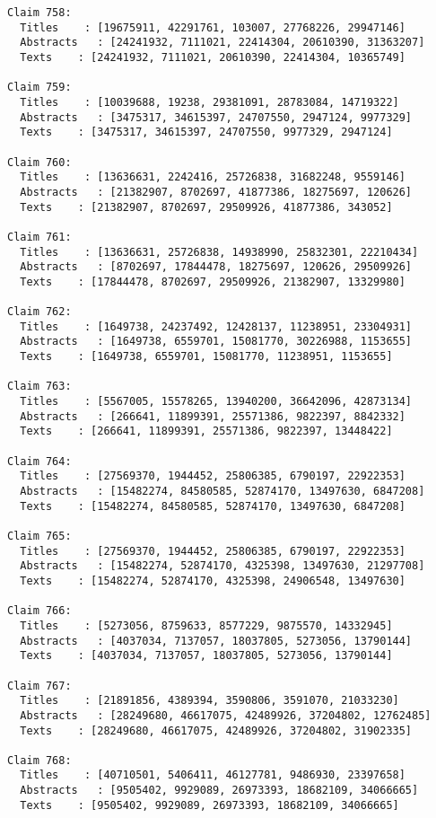 \documentclass[11pt]{article}
\begin{document}
\begin{Verbatim}[commandchars=\\\{\}]
Claim 758:
  Titles    : [19675911, 42291761, 103007, 27768226, 29947146]
  Abstracts   : [24241932, 7111021, 22414304, 20610390, 31363207]
  Texts    : [24241932, 7111021, 20610390, 22414304, 10365749]

Claim 759:
  Titles    : [10039688, 19238, 29381091, 28783084, 14719322]
  Abstracts   : [3475317, 34615397, 24707550, 2947124, 9977329]
  Texts    : [3475317, 34615397, 24707550, 9977329, 2947124]

Claim 760:
  Titles    : [13636631, 2242416, 25726838, 31682248, 9559146]
  Abstracts   : [21382907, 8702697, 41877386, 18275697, 120626]
  Texts    : [21382907, 8702697, 29509926, 41877386, 343052]

Claim 761:
  Titles    : [13636631, 25726838, 14938990, 25832301, 22210434]
  Abstracts   : [8702697, 17844478, 18275697, 120626, 29509926]
  Texts    : [17844478, 8702697, 29509926, 21382907, 13329980]

Claim 762:
  Titles    : [1649738, 24237492, 12428137, 11238951, 23304931]
  Abstracts   : [1649738, 6559701, 15081770, 30226988, 1153655]
  Texts    : [1649738, 6559701, 15081770, 11238951, 1153655]

Claim 763:
  Titles    : [5567005, 15578265, 13940200, 36642096, 42873134]
  Abstracts   : [266641, 11899391, 25571386, 9822397, 8842332]
  Texts    : [266641, 11899391, 25571386, 9822397, 13448422]

Claim 764:
  Titles    : [27569370, 1944452, 25806385, 6790197, 22922353]
  Abstracts   : [15482274, 84580585, 52874170, 13497630, 6847208]
  Texts    : [15482274, 84580585, 52874170, 13497630, 6847208]

Claim 765:
  Titles    : [27569370, 1944452, 25806385, 6790197, 22922353]
  Abstracts   : [15482274, 52874170, 4325398, 13497630, 21297708]
  Texts    : [15482274, 52874170, 4325398, 24906548, 13497630]

Claim 766:
  Titles    : [5273056, 8759633, 8577229, 9875570, 14332945]
  Abstracts   : [4037034, 7137057, 18037805, 5273056, 13790144]
  Texts    : [4037034, 7137057, 18037805, 5273056, 13790144]

Claim 767:
  Titles    : [21891856, 4389394, 3590806, 3591070, 21033230]
  Abstracts   : [28249680, 46617075, 42489926, 37204802, 12762485]
  Texts    : [28249680, 46617075, 42489926, 37204802, 31902335]

Claim 768:
  Titles    : [40710501, 5406411, 46127781, 9486930, 23397658]
  Abstracts   : [9505402, 9929089, 26973393, 18682109, 34066665]
  Texts    : [9505402, 9929089, 26973393, 18682109, 34066665]


\end{Verbatim}
\end{document}
